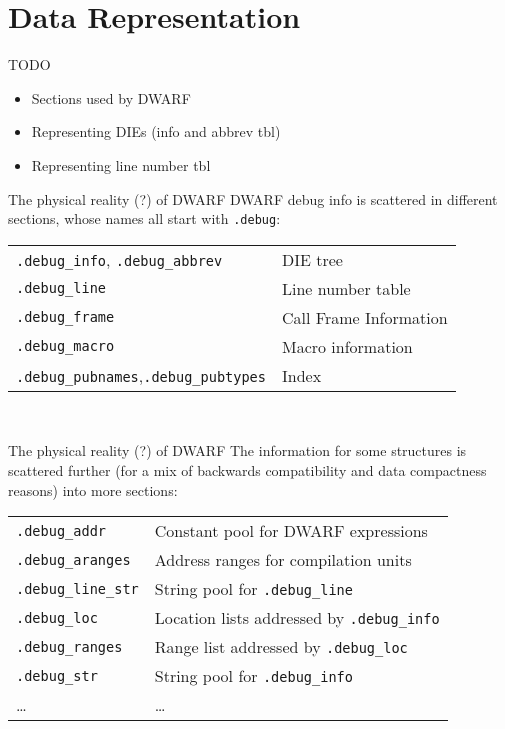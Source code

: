 
\section{Data Representation}


\begin{frame}{TODO}
\begin{itemize}
\item Sections used by DWARF
\item Representing DIEs (info and abbrev tbl)
\item Representing line number tbl
\end{itemize}
\end{frame}


\begin{frame}{The physical reality (?) of DWARF}
DWARF debug info is scattered in different sections, whose names all start with \texttt{.debug}:\\
\bigskip
\begin{tabular}{ l l }
\texttt{.debug\_info}, \texttt{.debug\_abbrev} & DIE tree \\
\texttt{.debug\_line} & Line number table\\
\texttt{.debug\_frame} & Call Frame Information \\
\texttt{.debug\_macro} & Macro information \\
\texttt{.debug\_pubnames},\texttt{.debug\_pubtypes}  & Index \\
\end{tabular}\\
\end{frame}


\begin{frame}{The physical reality (?) of DWARF}
The information for some structures is \alert{scattered further} (for a mix of backwards
compatibility and data compactness reasons) into \alert{more sections}:\\
\bigskip
\begin{tabular}{ l l }
\texttt{.debug\_addr} & Constant pool for DWARF expressions\\
\texttt{.debug\_aranges} & Address ranges for compilation units\\
\texttt{.debug\_line\_str} & String pool for \texttt{.debug\_line}\\
\texttt{.debug\_loc} & Location lists addressed by \texttt{.debug\_info}\\
\texttt{.debug\_ranges} & Range list addressed by \texttt{.debug\_loc}\\
\texttt{.debug\_str} & String pool for \texttt{.debug\_info}\\
\ldots & \ldots
\end{tabular}\\
\end{frame}


